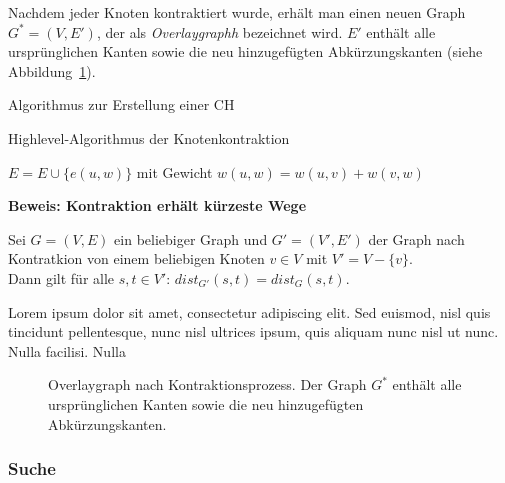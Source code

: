Nachdem jeder Knoten kontraktiert wurde, erhält man einen neuen Graph  ${G^{*} = (V,E')}$, der als
\emph{Overlaygraphh} bezeichnet wird. $E'$ enthält alle ursprünglichen Kanten sowie die neu
hinzugefügten Abkürzungskanten (siehe Abbildung~\ref{fig:overlaygraph}).

Algorithmus zur Erstellung einer \ac{CH}

\begin{algorithm}[H]
    \caption{Highlevel-Algorithmus der Knotenkontraktion}
    \label{algo:contraction}
    \begin{algorithmic}
        \State $E = E \cup \{e(u,w)\}$ mit Gewicht ${w(u,w) = w(u,v) + w(v,w)}$
        \EndIf
        \EndFor
        \EndFor
        \EndFor
        \EndFunction
    \end{algorithmic}
\end{algorithm}

\textbf{Beweis: Kontraktion erhält kürzeste Wege}
\begin{lemma}
    Sei $G = (V,E)$ ein beliebiger Graph und $G' = (V',E')$ der Graph nach Kontratkion von einem
    beliebigen Knoten $v \in V$ mit $V' = V - \{v\}$.\\
    Dann gilt für alle $s,t \in V'$: ${dist_{G'}(s,t) = dist_{G}(s,t)}$.
\end{lemma}
Lorem ipsum dolor sit amet, consectetur adipiscing elit. Sed euismod, nisl quis tincidunt
pellentesque, nunc nisl ultrices ipsum, quis aliquam nunc nisl ut nunc. Nulla facilisi. Nulla


\begin{figure}
    \centering
    
    \caption[Overlaygraph]{Overlaygraph nach Kontraktionsprozess. Der Graph $G^{*}$ enthält alle
        ursprünglichen Kanten sowie die neu hinzugefügten Abkürzungskanten.}
    \label{fig:overlaygraph}
\end{figure}

\subsubsection{Suche}